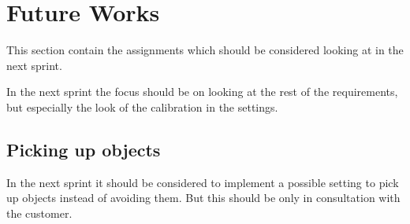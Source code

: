 \section{Future Works}
This section contain the assignments which should be considered looking at in the next sprint.

In the next sprint the focus should be on looking at the rest of the requirements, but especially the look of the calibration in the settings.

\subsection{Picking up objects}
In the next sprint it should be considered to implement a possible setting to pick up objects instead of avoiding them.
But this should be only in consultation with the customer.